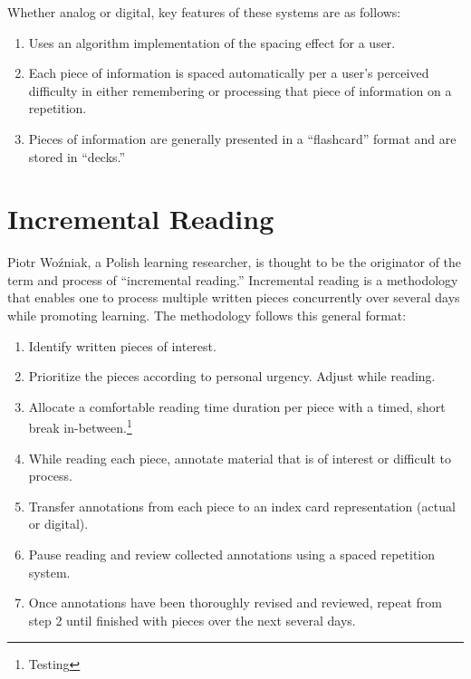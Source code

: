 \documentclass[
  notoc %
]{tufte-book}
\providecommand{\tightlist}{%
  \setlength{\itemsep}{0pt}\setlength{\parskip}{0pt}
}
\begin{document}
Whether analog or digital, key features of these systems are as follows:

\begin{enumerate}
\def\labelenumi{\arabic{enumi}.}
\tightlist
\item
  Uses an algorithm implementation of the spacing effect for a user.
\item
  Each piece of information is spaced automatically per a user's
  perceived difficulty in either remembering or processing that piece of
  information on a repetition.
\item
  Pieces of information are generally presented in a ``flashcard''
  format and are stored in ``decks.''
\end{enumerate}

\hypertarget{sec:incremental-reading}{%
\section{Incremental Reading}\label{sec:incremental-reading}}

Piotr Woźniak, a Polish learning researcher, is thought to be the
originator of the term and process of ``incremental reading.''
Incremental reading is a methodology that enables one to process
multiple written pieces concurrently over several days while promoting
learning. The methodology follows this general format:

\begin{enumerate}
\def\labelenumi{\arabic{enumi}.}
\tightlist
\item
  Identify written pieces of interest.
\item
  Prioritize the pieces according to personal urgency. Adjust while
  reading.
\item
  Allocate a comfortable reading time duration per piece with a timed,
  short break in-between.\footnote{Testing}
\item
  While reading each piece, annotate material that is of interest or
  difficult to process.
\item
  Transfer annotations from each piece to an index card representation
  (actual or digital).
\item
  Pause reading and review collected annotations using a spaced
  repetition system.
\item
  Once annotations have been thoroughly revised and reviewed, repeat
  from step 2 until finished with pieces over the next several days.
\end{enumerate}
\end{document}
